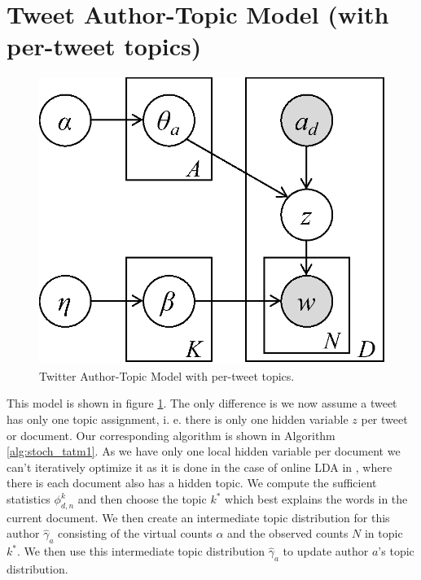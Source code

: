 \section{Tweet Author-Topic Model (with per-tweet topics)}
\begin{figure}[h]
\centering
\includegraphics[width=0.3\linewidth]{TATM1}
\caption{Twitter Author-Topic Model with per-tweet topics.}
\label{fig:TATM1}
\end{figure}
This model is shown in figure \ref{fig:TATM1}. The only difference is we now assume a tweet has only one topic assignment, i. e. there is only one hidden variable $z$ per tweet or document. Our corresponding algorithm is shown in Algorithm \ref{alg:stoch_tatm1}. As we have only one local hidden variable per document we can't iteratively optimize it as it is done in the case of online LDA in \cite{Hoffman12}, where there is each document also has a hidden topic. We compute the sufficient statistics $\phi_{d,n}^k$ and then choose the topic $k^*$ which best explains the words in the current document. We then create an intermediate topic distribution for this author $\hat\gamma_a$ consisting of the virtual counts $\alpha$ and the observed counts $N$ in topic $k^*$. We then use this intermediate topic distribution $\hat\gamma_a$ to update author $a$'s topic distribution.
